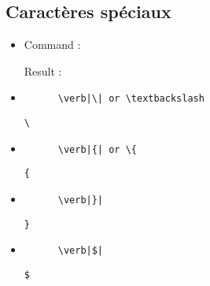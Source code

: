 \documentclass[a4paper,12pt]{article}
\begin{document}
\subsection{Caractères spéciaux}
\begin{itemize}
  \renewcommand\labelitemi{}
  \item
  \begin{minipage}[t]{.60\linewidth}
    Command :
    \\
  \end{minipage} \hfill
  \begin{minipage}[t]{.46\linewidth}
     Result :
     \\
  \end{minipage} \hfill
  \item
  \begin{minipage}[t]{.60\linewidth}
    \begin{verbatim}
      \verb|\| or \textbackslash
    \end{verbatim}
  \end{minipage} \hfill
  \begin{minipage}[t]{.46\linewidth}
     \verb|\|
  \end{minipage}
  \item
  \begin{minipage}[t]{.60\linewidth}
    \begin{verbatim}
      \verb|{| or \{
    \end{verbatim}
  \end{minipage} \hfill
  \begin{minipage}[t]{.46\linewidth}
     \verb|{|
  \end{minipage}
  \item
  \begin{minipage}[t]{.60\linewidth}
    \begin{verbatim}
      \verb|}|
    \end{verbatim}
  \end{minipage} \hfill
  \begin{minipage}[t]{.46\linewidth}
     \verb|}|
  \end{minipage}
  \item
  \begin{minipage}[t]{.60\linewidth}
    \begin{verbatim}
      \verb|$|
    \end{verbatim}
  \end{minipage} \hfill
  \begin{minipage}[t]{.46\linewidth}
     \verb|$|
  \end{minipage}

\end{itemize}
\end{document}
